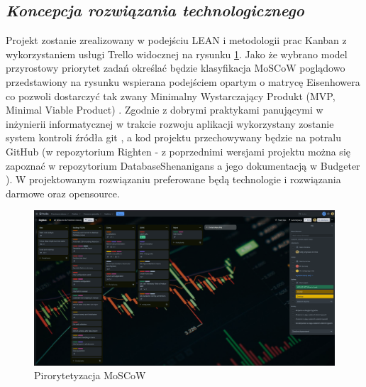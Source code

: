 \documentclass[a4paper,10pt, twoside]{report}
\newcommand{\customstylesection}[1]{\textbf{\textit{#1}}}
\begin{document}
\begin{large}
\section{\customstylesection{Koncepcja rozwiązania technologicznego}}
{Projekt zostanie zrealizowany w podejściu LEAN \cite{LEAN} i metodologii prac 
Kanban \cite{Kanban} z wykorzystaniem usługi Trello \cite{Trello} widocznej na 
rysunku \ref*{fig:trello}. Jako że wybrano model przyrostowy 
\cite{Model Przyrostowy} priorytet zadań określać będzie klasyfikacja MoSCoW 
\cite{MOSCOW} poglądowo przedstawiony na rysunku wspierana podejściem opartym 
o matrycę Eisenhowera\cite{MatrycaEisenhowera} co pozwoli dostarczyć tak zwany 
Minimalny Wystarczający Produkt (MVP, Minimal Viable Product) \cite{MVP}. 
Zgodnie z dobrymi praktykami panującymi w inżynierii informatycznej w trakcie 
rozwoju aplikacji wykorzystany zostanie system kontroli źródła git \cite{GIT}, 
a kod projektu przechowywany będzie na potralu GitHub \cite{GitHub} (w 
repozytorium Righten \cite{GITRighten} - z poprzednimi wersjami projektu można 
się zapoznać w repozytorium DatabaseShenanigans \cite{GITBudgeterApp} a jego 
dokumentacją w Budgeter \cite{GITBudgeterDoc}). W projektowanym rozwiązaniu 
preferowane będą technologie i rozwiązania darmowe oraz opensource.}

\begin{figure}[H]           %
    \centering
    \includegraphics[width=12cm]{figures/trello_kanban.png}
    \caption{Pirorytetyzacja MoSCoW}
    \label{fig:trello}
\end{figure}


\end{large}
\end{document}
